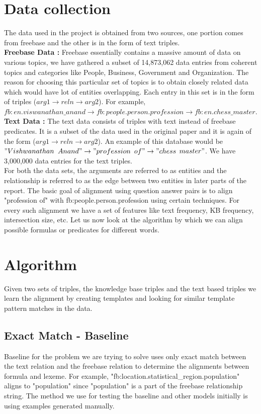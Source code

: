 \documentclass[12pt, a4paper]{article}
\begin{document}
\section{Data collection}
The data used in the project is obtained from two sources, one portion comes from freebase and the other is in the form of text triples.\\

{\bf Freebase Data : }Freebase essentially contains a massive amount of data on various topics, we have gathered a subset of 14,873,062 data entries from coherent topics and categories like People, Business, Government and Organization. The reason for choosing this particular set of topics is to obtain closely related data which would have lot of entities overlapping. Each entry in this set is in the form of triples ($arg1\rightarrow reln \rightarrow arg2$). For example, $fb:en.viswanathan\_anand \rightarrow	fb:people.person.profession \rightarrow	fb:en.chess\_master$. \\

{\bf Text Data : }The text data consists of triples with text instead of freebase predicates. It is a subset of the data used in the original paper and it is again of the form ($arg1\rightarrow reln \rightarrow arg2$). An example of this database would be $"Vishwanathan$ $Anand" \rightarrow "profession$ $of" \rightarrow "chess$ $master"$. We have 3,000,000 data entries for the text triples.\\

For both the data sets, the arguments are referred to as entities and the relationship is referred to as the edge between two entities in later parts of the report. The basic goal of alignment using question answer pairs is to align "profession of" with fb:people.person.profession using certain techniques. For every such alignment we have a set of features like text frequency, KB frequency, intersection size, etc.
Let us now look at the algorithm by which we can align possible formulas or predicates for different words.

\section{Algorithm}
Given two sets of triples, the knowledge base triples and the text based triples we learn the alignment by creating templates and looking for similar template pattern matches in the data.\\

\subsection{Exact Match - Baseline}
Baseline for the problem we are trying to solve uses only exact match between the text relation and the freebase relation to determine the alignments between formula and lexeme. For example, "fb:location.statistical\_region.population" aligns to  "population" since "population" is a part of the freebase relationship string. The method we use for testing the baseline and other models initially is using examples generated manually. 
\end{document}
